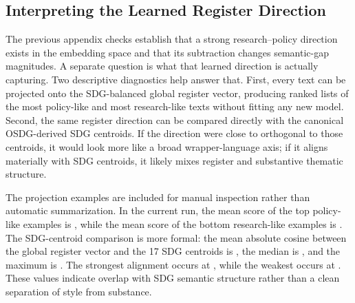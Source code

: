 \documentclass[12pt,a4paper]{article}
\begin{document}
\subsection{Interpreting the Learned Register Direction}

The previous appendix checks establish that a strong research--policy direction exists in the embedding space and that its subtraction changes semantic-gap magnitudes. A separate question is what that learned direction is actually capturing. Two descriptive diagnostics help answer that. First, every text can be projected onto the SDG-balanced global register vector, producing ranked lists of the most policy-like and most research-like texts without fitting any new model. Second, the same register direction can be compared directly with the canonical OSDG-derived SDG centroids. If the direction were close to orthogonal to those centroids, it would look more like a broad wrapper-language axis; if it aligns materially with SDG centroids, it likely mixes register and substantive thematic structure.

The projection examples are included for manual inspection rather than automatic summarization. In the current run, the mean score of the top policy-like examples is \RegisterProjectionPolicyTopMean{}, while the mean score of the bottom research-like examples is \RegisterProjectionResearchBottomMean{}. The SDG-centroid comparison is more formal: the mean absolute cosine between the global register vector and the 17 SDG centroids is \RegisterAlignmentMeanAbsCosine{}, the median is \RegisterAlignmentMedianAbsCosine{}, and the maximum is \RegisterAlignmentMaxAbsCosine{}. The strongest alignment occurs at \RegisterAlignmentStrongestSdg{}, while the weakest occurs at \RegisterAlignmentWeakestSdg{}. These values indicate overlap with SDG semantic structure rather than a clean separation of style from substance.

\begin{table}[ht]
\centering
\caption{Alignment between the SDG-balanced global register direction and the canonical SDG centroids. The final column reports the matching within-SDG register-versus-centroid cosine when an SDG-specific register vector is available.}
\label{tab:register-sdg-alignment}

\end{table}

\begin{table}[ht]
\centering
\small
\caption{Manual-inspection examples from the learned global register direction. The policy-like rows have the highest positive projection onto the global register vector; the research-like rows have the lowest projection.}
\label{tab:register-projection-examples}
\resizebox{\textwidth}{!}{%

}
\end{table}
\end{document}
